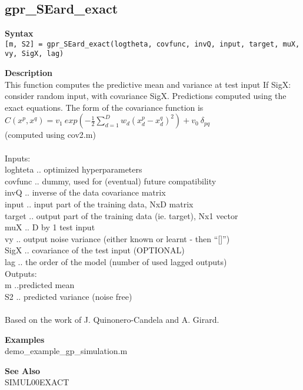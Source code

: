 \subsection*{gpr\_SEard\_exact} \label{fun:gpr_SEard_exact}


\textbf{Syntax}
\\  \texttt{[m, S2] = gpr\_SEard\_exact(logtheta, covfunc, invQ, input, target, muX, vy, SigX, lag)}

\textbf{Description}
\\ This function computes the predictive mean and variance at test input
 If SigX: consider random input, with covariance SigX.
 Predictions computed using the exact equations.
 The form of the covariance function is
$C(x^p,x^q) = v_1 \ exp \left( -\frac{1}{2} \sum_{d=1}^D w_d
(x^p_d - x^q_d)^2 \right) + v_0 \ \delta_{pq}$
\\  (computed using cov2.m)
\\
\\ Inputs:
\\ loghteta .. optimized hyperparameters
\\ covfunc .. dummy, used for (eventual) future compatibility
\\ invQ .. inverse of the data covariance matrix
\\ input .. input part of the training data,  NxD matrix
\\ target .. output part of the training data (ie. target), Nx1 vector
\\ muX  ..     D by 1 test input
\\ vy   ..     output noise variance (either known or learnt - then ``[]'')
\\ SigX  ..    covariance of the test input (OPTIONAL)
\\ lag .. the order of the model (number of used lagged outputs)
\\ Outputs:
\\ m  ..predicted mean
\\ S2 .. predicted variance (noise free)
\\
\\ Based on the work of J. Quinonero-Candela and A. Girard.

\textbf{Examples}
\\ demo\_example\_gp\_simulation.m

\textbf{See Also}
\\ SIMUL00EXACT
